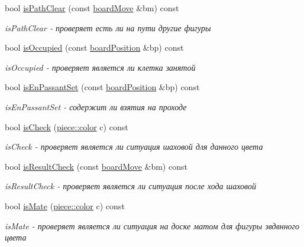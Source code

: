 \begin{DoxyCompactItemize}
bool \hyperlink{classboard_afcf992b9c9ec619099f41513c86cb4a9}{is\+Path\+Clear} (const \hyperlink{classboard_move}{board\+Move} \&bm) const 
\begin{DoxyCompactList}\small\item\em is\+Path\+Clear -\/ проверяет есть ли на пути другие фигуры \end{DoxyCompactList}\item 
bool \hyperlink{classboard_ab7b060ee3893cb79fc4d8376632f0f20}{is\+Occupied} (const \hyperlink{classboard_position}{board\+Position} \&bp) const 
\begin{DoxyCompactList}\small\item\em is\+Occupied -\/ проверяет является ли клетка занятой \end{DoxyCompactList}\item 
bool \hyperlink{classboard_a49c3688bb5c36807624e3c5f1669f203}{is\+En\+Passant\+Set} (const \hyperlink{classboard_position}{board\+Position} \&bp) const 
\begin{DoxyCompactList}\small\item\em is\+En\+Passant\+Set -\/ содержит ли взятия на проходе \end{DoxyCompactList}\item 
bool \hyperlink{classboard_ac879df88ca819e95d1a02d676efd59c0}{is\+Check} (\hyperlink{classpiece_a0e121e5952345fd0e7014a8e6a1fbbda}{piece\+::color} c) const 
\begin{DoxyCompactList}\small\item\em is\+Check -\/ проверяет является ли ситуация шаховой для данного цвета \end{DoxyCompactList}\item 
bool \hyperlink{classboard_a69189b33f0ee2c1b4176583382116aae}{is\+Result\+Check} (const \hyperlink{classboard_move}{board\+Move} \&bm) const 
\begin{DoxyCompactList}\small\item\em is\+Result\+Check -\/ проверяет является ли ситуация после хода шаховой \end{DoxyCompactList}\item 
bool \hyperlink{classboard_af9cea4c28839fd5f9b6d5aaec28ba14d}{is\+Mate} (\hyperlink{classpiece_a0e121e5952345fd0e7014a8e6a1fbbda}{piece\+::color} c) const 
\begin{DoxyCompactList}\small\item\em is\+Mate -\/ проверяет является ли ситуация на доске матом для фигуры звдвнного цвета \end{DoxyCompactList}\item 

\end{DoxyCompactItemize}

